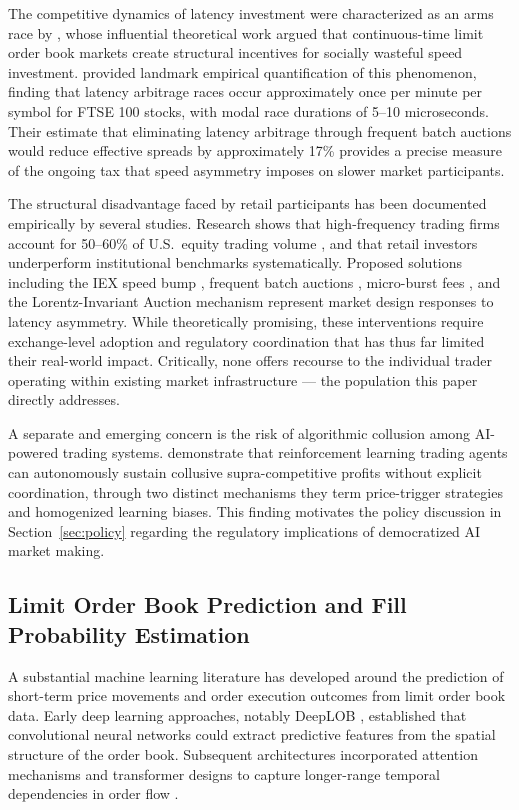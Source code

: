 \documentclass[12pt]{article}
\begin{document}
The competitive dynamics of latency investment were characterized as an arms race by \citet{budish2015}, whose influential theoretical work argued that continuous-time limit order book markets create structural incentives for socially wasteful speed investment. \citet{aquilina2022} provided landmark empirical quantification of this phenomenon, finding that latency arbitrage races occur approximately once per minute per symbol for FTSE 100 stocks, with modal race durations of 5--10 microseconds. Their estimate that eliminating latency arbitrage through frequent batch auctions would reduce effective spreads by approximately 17\% provides a precise measure of the ongoing tax that speed asymmetry imposes on slower market participants.

The structural disadvantage faced by retail participants has been documented empirically by several studies. Research shows that high-frequency trading firms account for 50--60\% of U.S.\ equity trading volume \citep{lin2024}, and that retail investors underperform institutional benchmarks systematically. Proposed solutions including the IEX speed bump \citep{hu2019}, frequent batch auctions \citep{budish2015}, micro-burst fees \citep{brolley2023}, and the Lorentz-Invariant Auction mechanism \citep{barzykin2026} represent market design responses to latency asymmetry. While theoretically promising, these interventions require exchange-level adoption and regulatory coordination that has thus far limited their real-world impact. Critically, none offers recourse to the individual trader operating within existing market infrastructure --- the population this paper directly addresses.

A separate and emerging concern is the risk of algorithmic collusion among AI-powered trading systems. \citet{dou2025} demonstrate that reinforcement learning trading agents can autonomously sustain collusive supra-competitive profits without explicit coordination, through two distinct mechanisms they term price-trigger strategies and homogenized learning biases. This finding motivates the policy discussion in Section~\ref{sec:policy} regarding the regulatory implications of democratized AI market making.

\subsection{Limit Order Book Prediction and Fill Probability Estimation}

A substantial machine learning literature has developed around the prediction of short-term price movements and order execution outcomes from limit order book data. Early deep learning approaches, notably DeepLOB \citep{zhang2019}, established that convolutional neural networks could extract predictive features from the spatial structure of the order book. Subsequent architectures incorporated attention mechanisms and transformer designs to capture longer-range temporal dependencies in order flow \citep{jung2024,berti2025}.
\end{document}
